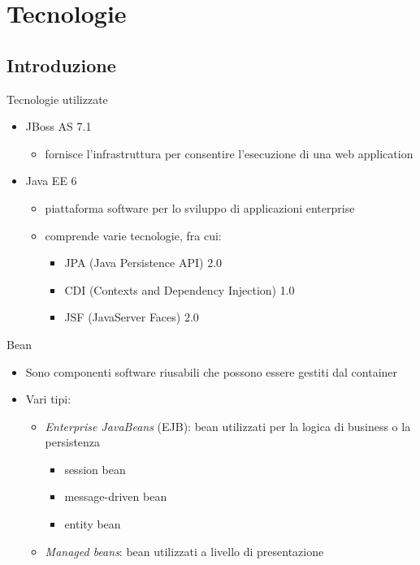 \section{Tecnologie}

\subsection{Introduzione}

\begin{frame}{Tecnologie utilizzate}

\begin{itemize}
\item JBoss AS 7.1
	\begin{itemize}
	\item fornisce l'infrastruttura per consentire l'esecuzione di una web application
	\end{itemize}

\item Java EE 6
	\begin{itemize}
	\item piattaforma software per lo sviluppo di applicazioni enterprise
	\item comprende varie tecnologie, fra cui:
		\begin{itemize}
		\item JPA (Java Persistence API) 2.0
		\item CDI (Contexts and Dependency Injection) 1.0
		\item JSF (JavaServer Faces) 2.0
		\end{itemize}
		
	\end{itemize}

\end{itemize}


\end{frame}

\begin{frame}{Bean}

\begin{itemize}
\item Sono componenti software riusabili che possono essere gestiti dal container

\item Vari tipi:
	\begin{itemize}
	
	\item \textsl{Enterprise JavaBeans} (EJB): bean utilizzati per la logica di business o la persistenza
		\begin{itemize}
		\item session bean
		\item message-driven bean
		\item entity bean
		\end{itemize}
		
	\item  \textsl{Managed beans}: bean utilizzati a livello di presentazione
	\end{itemize}

\end{itemize}

\end{frame}


